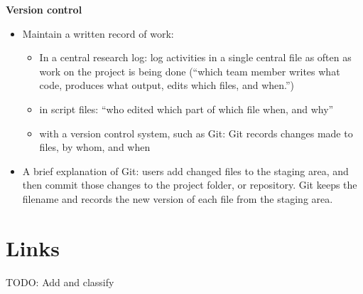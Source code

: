 \documentclass[]{book}
\providecommand{\tightlist}{%
  \setlength{\itemsep}{0pt}\setlength{\parskip}{0pt}}
\begin{document}
\textbf{Version control}

\begin{itemize}
\tightlist
\item
  Maintain a written record of work:

  \begin{itemize}
  \tightlist
  \item
    In a central research log: log activities in a single central file as often as work on the project is being done (``which team member writes what code, produces what output, edits which files, and when.'')
  \item
    in script files: ``who edited which part of which file when, and why''
  \item
    with a version control system, such as Git: Git records changes made to files, by whom, and when
  \end{itemize}
\item
  A brief explanation of Git: users add changed files to the staging area, and then commit those changes to the project folder, or repository. Git keeps the filename and records the new version of each file from the staging area.
\end{itemize}

\hypertarget{links}{%
\section{Links}\label{links}}

TODO: Add and classify
\end{document}
